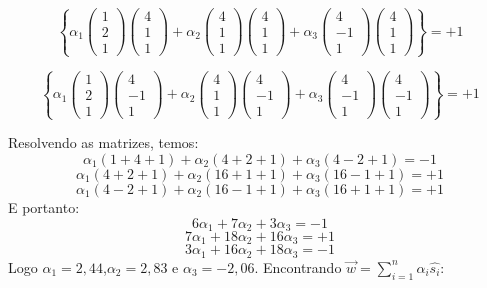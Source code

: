 \documentclass[
]{book}
\begin{document}
\[\left\{
\alpha_1
\begin{pmatrix}
1\\2\\1
\end{pmatrix}
\begin{pmatrix}
4\\1\\1
\end{pmatrix} +
\alpha_2
\begin{pmatrix}
4\\1\\1
\end{pmatrix}
\begin{pmatrix}
4\\1\\1
\end{pmatrix}+
\alpha_3
\begin{pmatrix}
4\\-1\\1
\end{pmatrix}
\begin{pmatrix}
4\\1\\1
\end{pmatrix}
\right\}=+1\]

\[\left\{
\alpha_1
\begin{pmatrix}
1\\2\\1
\end{pmatrix}
\begin{pmatrix}
4\\-1\\1
\end{pmatrix} +
\alpha_2
\begin{pmatrix}
4\\1\\1
\end{pmatrix}
\begin{pmatrix}
4\\-1\\1
\end{pmatrix}+
\alpha_3
\begin{pmatrix}
4\\-1\\1
\end{pmatrix}
\begin{pmatrix}
4\\-1\\1
\end{pmatrix}
\right\}=+1\]

Resolvendo as matrizes, temos:
\[\alpha_1(1+4+1)+\alpha_2(4+2+1)+\alpha_3(4-2+1)=-1\]
\[\alpha_1(4+2+1)+\alpha_2(16+1+1)+\alpha_3(16-1+1)=+1\]
\[\alpha_1(4-2+1)+\alpha_2(16-1+1)+\alpha_3(16+1+1)=+1\]
E portanto:
\[6\alpha_1+7\alpha_2+3\alpha_3=-1\]
\[7\alpha_1+18\alpha_2+16\alpha_3=+1\]
\[3\alpha_1+16\alpha_2+18\alpha_3=-1\]
Logo \(\alpha_1=2,44\),\(\alpha_2=2,83\) e \(\alpha_3=-2,06\). Encontrando \(\vec{w}=\displaystyle \sum^n_{i=1}\alpha_i \hat{s_i}\):
\end{document}
